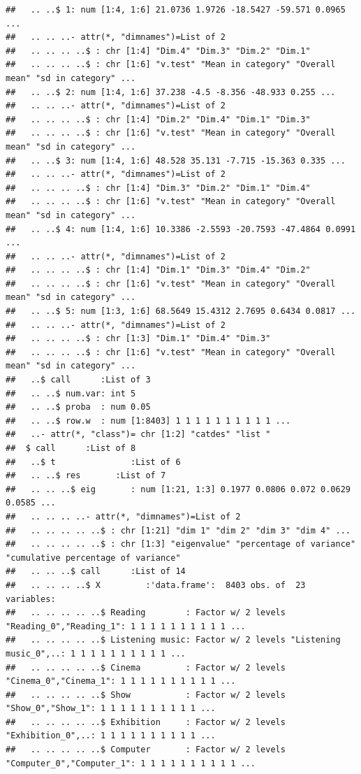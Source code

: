 \documentclass[]{book}
\begin{document}
\begin{verbatim}
##   .. ..$ 1: num [1:4, 1:6] 21.0736 1.9726 -18.5427 -59.571 0.0965 ...
##   .. .. ..- attr(*, "dimnames")=List of 2
##   .. .. .. ..$ : chr [1:4] "Dim.4" "Dim.3" "Dim.2" "Dim.1"
##   .. .. .. ..$ : chr [1:6] "v.test" "Mean in category" "Overall mean" "sd in category" ...
##   .. ..$ 2: num [1:4, 1:6] 37.238 -4.5 -8.356 -48.933 0.255 ...
##   .. .. ..- attr(*, "dimnames")=List of 2
##   .. .. .. ..$ : chr [1:4] "Dim.2" "Dim.4" "Dim.1" "Dim.3"
##   .. .. .. ..$ : chr [1:6] "v.test" "Mean in category" "Overall mean" "sd in category" ...
##   .. ..$ 3: num [1:4, 1:6] 48.528 35.131 -7.715 -15.363 0.335 ...
##   .. .. ..- attr(*, "dimnames")=List of 2
##   .. .. .. ..$ : chr [1:4] "Dim.3" "Dim.2" "Dim.1" "Dim.4"
##   .. .. .. ..$ : chr [1:6] "v.test" "Mean in category" "Overall mean" "sd in category" ...
##   .. ..$ 4: num [1:4, 1:6] 10.3386 -2.5593 -20.7593 -47.4864 0.0991 ...
##   .. .. ..- attr(*, "dimnames")=List of 2
##   .. .. .. ..$ : chr [1:4] "Dim.1" "Dim.3" "Dim.4" "Dim.2"
##   .. .. .. ..$ : chr [1:6] "v.test" "Mean in category" "Overall mean" "sd in category" ...
##   .. ..$ 5: num [1:3, 1:6] 68.5649 15.4312 2.7695 0.6434 0.0817 ...
##   .. .. ..- attr(*, "dimnames")=List of 2
##   .. .. .. ..$ : chr [1:3] "Dim.1" "Dim.4" "Dim.3"
##   .. .. .. ..$ : chr [1:6] "v.test" "Mean in category" "Overall mean" "sd in category" ...
##   ..$ call      :List of 3
##   .. ..$ num.var: int 5
##   .. ..$ proba  : num 0.05
##   .. ..$ row.w  : num [1:8403] 1 1 1 1 1 1 1 1 1 1 ...
##   ..- attr(*, "class")= chr [1:2] "catdes" "list "
##  $ call      :List of 8
##   ..$ t               :List of 6
##   .. ..$ res       :List of 7
##   .. .. ..$ eig       : num [1:21, 1:3] 0.1977 0.0806 0.072 0.0629 0.0585 ...
##   .. .. .. ..- attr(*, "dimnames")=List of 2
##   .. .. .. .. ..$ : chr [1:21] "dim 1" "dim 2" "dim 3" "dim 4" ...
##   .. .. .. .. ..$ : chr [1:3] "eigenvalue" "percentage of variance" "cumulative percentage of variance"
##   .. .. ..$ call      :List of 14
##   .. .. .. ..$ X         :'data.frame':  8403 obs. of  23 variables:
##   .. .. .. .. ..$ Reading        : Factor w/ 2 levels "Reading_0","Reading_1": 1 1 1 1 1 1 1 1 1 1 ...
##   .. .. .. .. ..$ Listening music: Factor w/ 2 levels "Listening music_0",..: 1 1 1 1 1 1 1 1 1 1 ...
##   .. .. .. .. ..$ Cinema         : Factor w/ 2 levels "Cinema_0","Cinema_1": 1 1 1 1 1 1 1 1 1 1 ...
##   .. .. .. .. ..$ Show           : Factor w/ 2 levels "Show_0","Show_1": 1 1 1 1 1 1 1 1 1 1 ...
##   .. .. .. .. ..$ Exhibition     : Factor w/ 2 levels "Exhibition_0",..: 1 1 1 1 1 1 1 1 1 1 ...
##   .. .. .. .. ..$ Computer       : Factor w/ 2 levels "Computer_0","Computer_1": 1 1 1 1 1 1 1 1 1 1 ...

\end{verbatim}
\end{document}
